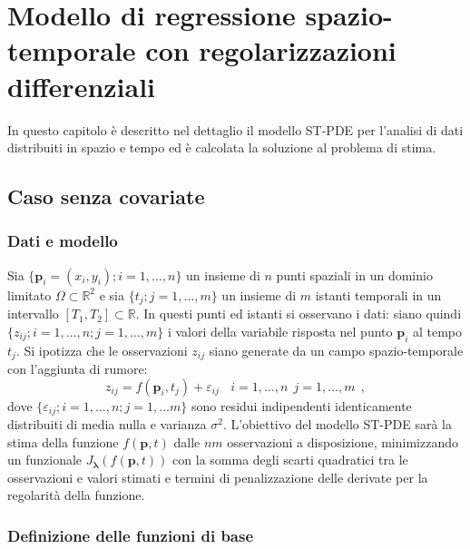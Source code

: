 \documentclass[a4paper,11pt,twoside,openright]{book}							%
\begin{document}
\chapter{Modello di regressione spazio-temporale con regolarizzazioni differenziali}
\label{cap:modello}
In questo capitolo è descritto nel dettaglio il modello ST-PDE per l'analisi di dati distribuiti in spazio e tempo ed è calcolata la soluzione al problema di stima.


\section{Caso senza covariate}

\subsection{Dati e modello}

Sia $\{\bm p_i = (x_i,y_i); i=1, \ldots , n\}$ un insieme di $n$ punti spaziali in un dominio limitato $\Omega \subset \mathbb R^2$ e sia $\{t_j ; j=1, \ldots , m\}$ un insieme di $m$ istanti temporali in un intervallo $[T_1,T_2]\subset \mathbb R$. In questi punti ed istanti si osservano i dati: siano quindi $\{ z_{ij};i=1, \ldots , n; j=1, \ldots , m \}$ i valori della variabile risposta nel punto $\bm p_i$ al tempo $t_j$. Si ipotizza che le osservazioni $z_{ij}$ siano generate da un campo spazio-temporale con l'aggiunta di rumore:
\begin{equation}
\label{eq:modellobase}
z_{ij}=f(\bm p_i,t_j)+\varepsilon_{ij}\ \ \ \ i = 1,\ldots,n\ \ j=1,\ldots,m \ \ ,
\end{equation}
dove $\{ \varepsilon_{ij}; i = 1,\ldots ,n; j=1,\ldots m\}$ sono residui indipendenti identicamente distribuiti di media nulla e varianza $\sigma^2$. L'obiettivo del modello ST-PDE sarà la stima della funzione $f(\bm p,t)$ dalle $nm$ osservazioni a disposizione, minimizzando un funzionale $J_{\bm \lambda }(f(\bm p,t))$ con la somma degli scarti quadratici tra le osservazioni e valori stimati e termini di penalizzazione delle derivate per la regolarità della funzione.



\subsection{Definizione delle funzioni di base}
\label{subs:basi}
\end{document}
